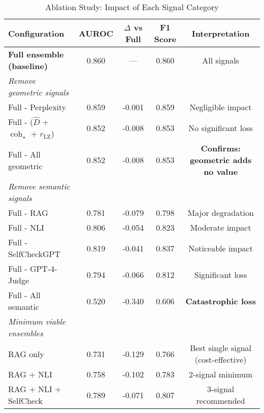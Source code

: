 \documentclass[11pt]{article}
\begin{document}
\begin{table}[h]
\centering
\caption{Ablation Study: Impact of Each Signal Category}
\label{tab:ablation}
\small
\begin{tabular}{lcccc}
\toprule
\textbf{Configuration} & \textbf{AUROC} & \textbf{$\Delta$ vs Full} & \textbf{F1 Score} & \textbf{Interpretation} \\
\midrule
\textbf{Full ensemble (baseline)} & 0.860 & --- & 0.860 & All signals \\
\midrule
\textit{Remove geometric signals} & & & & \\
Full - Perplexity & 0.859 & -0.001 & 0.859 & Negligible impact \\
Full - ($\hat{D}$ + $\operatorname{coh}_\star$ + $r_{\text{LZ}}$) & 0.852 & -0.008 & 0.853 & No significant loss \\
Full - All geometric & 0.852 & -0.008 & 0.853 & \textbf{Confirms: geometric adds no value} \\
\midrule
\textit{Remove semantic signals} & & & & \\
Full - RAG & 0.781 & -0.079 & 0.798 & Major degradation \\
Full - NLI & 0.806 & -0.054 & 0.823 & Moderate impact \\
Full - SelfCheckGPT & 0.819 & -0.041 & 0.837 & Noticeable impact \\
Full - GPT-4-Judge & 0.794 & -0.066 & 0.812 & Significant loss \\
Full - All semantic & 0.520 & -0.340 & 0.606 & \textbf{Catastrophic loss} \\
\midrule
\textit{Minimum viable ensembles} & & & & \\
RAG only & 0.731 & -0.129 & 0.766 & Best single signal (cost-effective) \\
RAG + NLI & 0.758 & -0.102 & 0.783 & 2-signal minimum \\
RAG + NLI + SelfCheck & 0.789 & -0.071 & 0.807 & 3-signal recommended \\
\bottomrule
\end{tabular}
\end{table}
\end{document}
